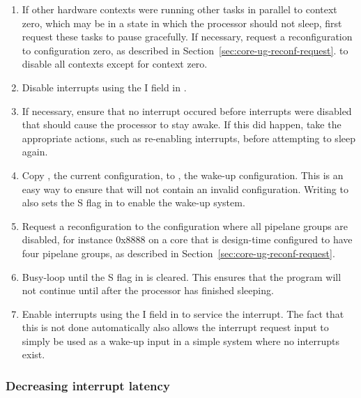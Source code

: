 \begin{enumerate}

\item If other hardware contexts were running other tasks in parallel to
context zero, which may be in a state in which the processor should not sleep,
first request these tasks to pause gracefully. If necessary, request a
reconfiguration to configuration zero, as described in 
Section~\ref{sec:core-ug-reconf-request}. to disable all contexts except for 
context zero.

\item Disable interrupts using the I field in .

\item If necessary, ensure that no interrupt occured before interrupts were
disabled that should cause the processor to stay awake. If this did happen,
take the appropriate actions, such as re-enabling interrupts, before attempting
to sleep again.

\item Copy , the current configuration, to , the wake-up
configuration. This is an easy way to ensure that  will not contain
an invalid configuration. Writing to  also sets the S flag in
 to enable the wake-up system.

\item Request a reconfiguration to the configuration where all pipelane groups 
are disabled, for instance 0x8888 on a core that is design-time configured to 
have four pipelane groups, as described in
Section~\ref{sec:core-ug-reconf-request}.

\item Busy-loop until the S flag in  is cleared. This ensures that
the program will not continue until after the processor has finished sleeping.

\item Enable interrupts using the I field in  to service the
interrupt. The fact that this is not done automatically also allows the
interrupt request input to simply be used as a wake-up input in a simple system
where no interrupts exist.

\end{enumerate}

\subsubsection{Decreasing interrupt latency}
\label{sec:core-ug-reconf-saw-latency}

